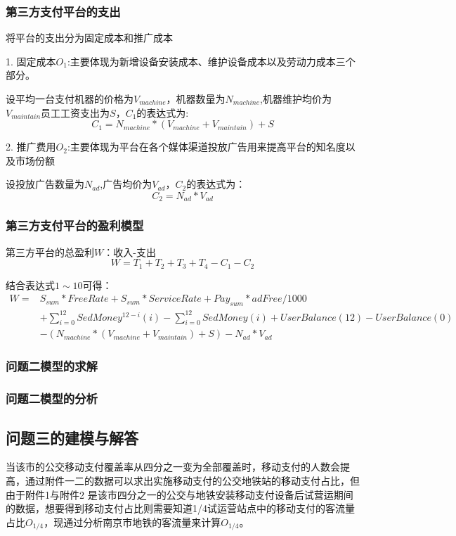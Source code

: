 \documentclass[withoutpreface,bwprint]{cumcmthesis} %
\begin{document}
\subsubsection{第三方支付平台的支出}
将平台的支出分为固定成本和推广成本

1. 固定成本$O_1$:主要体现为新增设备安装成本、维护设备成本以及劳动力成本三个部分。

设平均一台支付机器的价格为$V_{machine}$，机器数量为$N_{machine}$,机器维护均价为$V_{maintain}$员工工资支出为$S$，$C_1$的表达式为:
\begin{equation}
C_1=N_{machine}*(V_{machine}+V_{maintain})+S
\end{equation}

2. 推广费用$O_2$:主要体现为平台在各个媒体渠道投放广告用来提高平台的知名度以及市场份额

设投放广告数量为$N_{ad}$,广告均价为$V_{ad}$，$C_2$的表达式为：
\begin{equation}
C_2=N_{ad}*V_{ad}
\end{equation}

\subsubsection{第三方支付平台的盈利模型}
第三方平台的总盈利$W$：收入-支出
\begin{equation}
W=T_1+T_2+T_3+T_4-C_1-C_2
\end{equation}

结合表达式$1\sim10$可得：
\begin{equation}
\begin{split}
W=&S_{sum}*FreeRate+S_{sum}*ServiceRate+Pay_{sum}*adFree/1000\\&+\sum_{i=0}^{12} SedMoney^{12-i}(i)-\sum_{i=0}^{12} SedMoney(i)+UserBalance(12)-UserBalance(0)\\&-(N_{machine}*(V_{machine}+V_{maintain})+S)-N_{ad}*V_{ad}
\end{split}
\end{equation}

\subsubsection{问题二模型的求解}
\subsubsection{问题二模型的分析}
\subsection{问题三的建模与解答}
当该市的公交移动支付覆盖率从四分之一变为全部覆盖时，移动支付的人数会提高，通过附件一二的数据可以求出实施移动支付的公交地铁站的移动支付占比，但由于附件1与附件2 是该市四分之一的公交与地铁安装移动支付设备后试营运期间的数据，想要得到移动支付占比则需要知道1/4试运营站点中的移动支付的客流量占比$O_{1/4}$，现通过分析南京市地铁的客流量来计算$O_{1/4}$。
\end{document}
